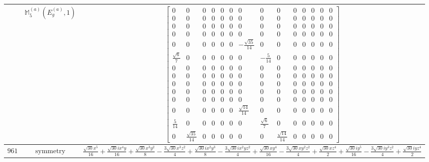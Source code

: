 \documentclass[fleqn,8pt,landscape]{jsarticle}
\begin{document}
\begin{longtable}{ccc}
$  $ & $ \mathbb{M}_{5}^{(a)}(E_{g}^{(a)},1) $ & $ \begin{bmatrix} 0 & 0 & 0 & 0 & 0 & 0 & 0 & 0 & 0 & 0 & 0 & 0 & 0 & 0 \\ 0 & 0 & 0 & 0 & 0 & 0 & 0 & 0 & 0 & 0 & 0 & 0 & 0 & 0 \\ 0 & 0 & 0 & 0 & 0 & 0 & 0 & 0 & 0 & 0 & 0 & 0 & 0 & 0 \\ 0 & 0 & 0 & 0 & 0 & 0 & 0 & 0 & 0 & 0 & 0 & 0 & 0 & 0 \\ 0 & 0 & 0 & 0 & 0 & 0 & - \frac{\sqrt{35}}{14} & 0 & 0 & 0 & 0 & 0 & 0 & 0 \\ \frac{\sqrt{6}}{7} & 0 & 0 & 0 & 0 & 0 & 0 & - \frac{5}{14} & 0 & 0 & 0 & 0 & 0 & 0 \\ 0 & 0 & 0 & 0 & 0 & 0 & 0 & 0 & 0 & 0 & 0 & 0 & 0 & 0 \\ 0 & 0 & 0 & 0 & 0 & 0 & 0 & 0 & 0 & 0 & 0 & 0 & 0 & 0 \\ 0 & 0 & 0 & 0 & 0 & 0 & 0 & 0 & 0 & 0 & 0 & 0 & 0 & 0 \\ 0 & 0 & 0 & 0 & 0 & 0 & 0 & 0 & 0 & 0 & 0 & 0 & 0 & 0 \\ 0 & 0 & 0 & 0 & 0 & 0 & 0 & 0 & 0 & 0 & 0 & 0 & 0 & 0 \\ 0 & 0 & 0 & 0 & 0 & 0 & \frac{\sqrt{14}}{14} & 0 & 0 & 0 & 0 & 0 & 0 & 0 \\ \frac{5}{14} & 0 & 0 & 0 & 0 & 0 & 0 & \frac{\sqrt{6}}{7} & 0 & 0 & 0 & 0 & 0 & 0 \\ 0 & \frac{\sqrt{35}}{14} & 0 & 0 & 0 & 0 & 0 & 0 & \frac{\sqrt{14}}{14} & 0 & 0 & 0 & 0 & 0 \end{bmatrix} $ \\ \hline
$ 961 $ & $ \text{symmetry} $ & $ \frac{\sqrt{30} x^{5}}{16} + \frac{\sqrt{30} i x^{4} y}{16} + \frac{\sqrt{30} x^{3} y^{2}}{8} - \frac{3 \sqrt{30} x^{3} z^{2}}{4} + \frac{\sqrt{30} i x^{2} y^{3}}{8} - \frac{3 \sqrt{30} i x^{2} y z^{2}}{4} + \frac{\sqrt{30} x y^{4}}{16} - \frac{3 \sqrt{30} x y^{2} z^{2}}{4} + \frac{\sqrt{30} x z^{4}}{2} + \frac{\sqrt{30} i y^{5}}{16} - \frac{3 \sqrt{30} i y^{3} z^{2}}{4} + \frac{\sqrt{30} i y z^{4}}{2} $ \\

\end{longtable}
\end{document}
